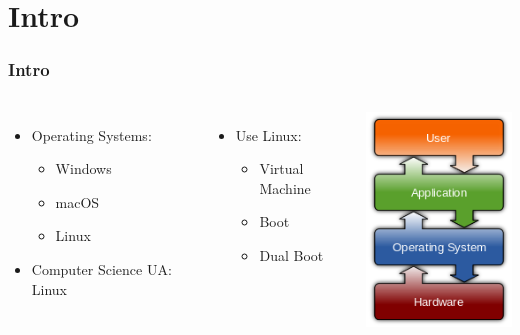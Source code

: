 
\section{Intro}
\begin{frame}
	\frametitle{Intro}

	\begin{columns}[c]
        	\begin{itemize}
            	\item Operating Systems:
                \begin{itemize}
            		\item Windows
                    \item macOS
                    \item Linux
            	\end{itemize}
                \item Computer Science UA: Linux
            \end{itemize}
            \begin{itemize}
                \item Use Linux:
                \begin{itemize}
            		\item Virtual Machine
                    \item Boot
                    \item Dual Boot
            	\end{itemize}
            \end{itemize}
            \centering
			\includegraphics[width=.7\linewidth,]{res/os}
    \end{columns}


\end{frame}
